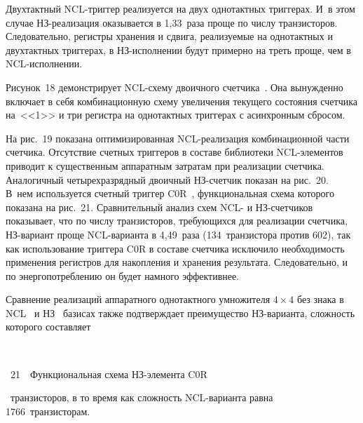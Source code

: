 \begin{multicols}{2}
       
       Двухтактный NCL-триггер реализуется на двух однотактных триггерах. И~в этом 
случае НЗ-реа\-ли\-за\-ция оказывается в 1,33~раза проще по числу транзисторов. 
Следовательно, регистры хранения и сдвига, реализуемые на однотактных и двухтактных 
триггерах, в НЗ-ис\-пол\-не\-нии будут примерно на треть проще, чем в NCL-ис\-пол\-не\-нии.
      
      Рисунок~18 демонстрирует NCL-схе\-му двоичного счетчика~\cite[рис.~36]{75-sok}. 
Она вынужденно включает в себя комбинационную схему увеличения текущего со\-сто\-яния 
счетчика на~<<1>> и три регистра на однотактных триггерах с асинхронным сбросом.

       
       На рис.~19 показана оптимизированная NCL-реа\-ли\-за\-ция комбинационной части 
счетчика. Отсутствие счетных триг\-ге\-ров в со\-ста\-ве библиотеки NCL-эле\-мен\-тов 
приводит к существенным аппаратным затратам при реализации счетчика. Аналогичный 
четырехразрядный двоичный НЗ-счет\-чик
 показан на рис.~20. В~нем используется счетный 
триггер C0R~\cite{69-sok}, функциональная схема которого показана на рис.~21. 
Сравнительный анализ схем  NCL- и НЗ-счет\-чи\-ков показывает, что по числу транзисторов, 
требующихся для реализации счетчика, НЗ-вариант проще NCL-варианта в 4,49~раза 
(134~транзистора против 602), так как использование триггера C0R в составе счетчика 
исключило необходимость применения регистров для накопления и хранения результата. 
Следовательно, и по энергопотреблению он будет намного эффективнее.


       
      Сравнение реализаций аппаратного однотактного умножителя $4\times 4$ без знака в 
NCL~\cite[рис.~59]{75-sok} и НЗ~\cite{55-sok} базисах также подтверждает преимущество 
НЗ-ва\-ри\-ан\-та, сложность которого составляет\linebreak\vspace*{-12pt}

\pagebreak

 \noindent
\begin{center}  %
\mbox{%
 \epsfxsize=71.899mm
 }
  \end{center}

  \vspace*{-3pt}

\noindent
{{\figurename~21}\ \ \small{Функциональная схема НЗ-элемента C0R}}

\vspace*{12pt}

~транзисторов, в то время как 
сложность NCL-ва\-ри\-ан\-та равна 1766~транзисторам. %




\end{multicols}
